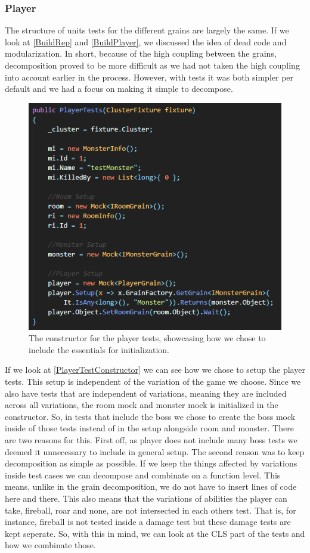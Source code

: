 \subsubsection{Player}
The structure of units tests for the different grains are largely the same. If we look at \autoref{BuildRep} and \autoref{BuildPlayer}, we discussed the idea of dead code and modularization. In short, because of the high coupling between the grains, decomposition proved to be more difficult as we had not taken the high coupling into account earlier in the process. However, with tests it was both simpler per default and we had a focus on making it simple to decompose. \\
\begin{figure}[h]
    \centering
    \includegraphics[width=0.7\linewidth]{Materials/TestingDiscussion/PlayerTestConstructor}
    \caption{The constructor for the player tests, showcasing how we chose to include the essentials for initialization.}
    \label{PlayerTestConstructor}
\end{figure}
If we look at \autoref{PlayerTestConstructor} we can see how we chose to setup the player tests. This setup is independent of the variation of the game we choose. Since we also have tests that are independent of variations, meaning they are included across all variations, the room mock and monster mock is initialized in the constructor. So, in tests that include the boss we chose to create the boss mock inside of those tests instead of in the setup alongside room and monster. There are two reasons for this. First off, as player does not include many boss tests we deemed it unnecessary to include in general setup. The second reason was to keep decomposition as simple as possible. If we keep the things affected by variations inside test cases we can decompose and combinate on a function level. This means, unlike in the grain decomposition, we do not have to insert lines of code here and there. This also means that the variations of abilities the player can take, fireball, roar and none, are not intersected in each others test. That is, for instance, fireball is not tested inside a damage test but these damage tests are kept seperate. So, with this in mind, we can look at the CLS part of the tests and how we combinate those. \\
